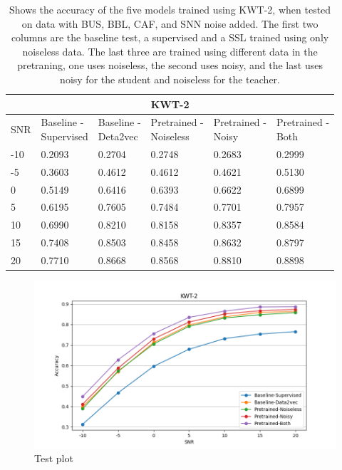 \begin{table}[H]
    \centering
    \begin{tabular}{@{}llllll@{}}
        \multicolumn{6}{c}{\textbf{KWT-2}}\\
        \toprule
        SNR    & \makecell[l]{ Baseline - \\ Supervised } & \makecell[l]{ Baseline - \\ Deta2vec } & \makecell[l]{ Pretrained - \\ Noiseless } & \makecell[l]{ Pretrained - \\ Noisy } & \makecell[l]{ Pretrained - \\ Both } \\ \midrule
        -10  & 0.2093 & 0.2704 & 0.2748 & 0.2683 & 0.2999 \\
        -5   & 0.3603 & 0.4612 & 0.4612 & 0.4621 & 0.5130 \\
        0    & 0.5149 & 0.6416 & 0.6393 & 0.6622 & 0.6899 \\
        5    & 0.6195 & 0.7605 & 0.7484 & 0.7701 & 0.7957 \\
        10   & 0.6990 & 0.8210 & 0.8158 & 0.8357 & 0.8584 \\
        15   & 0.7408 & 0.8503 & 0.8458 & 0.8632 & 0.8797 \\
        20   & 0.7710 & 0.8668 & 0.8568 & 0.8810 & 0.8898 \\
        
        \bottomrule
    \end{tabular}
    \caption{Shows the accuracy of the five models trained using KWT-2, when tested on data with BUS, BBL, CAF, and SNN noise added. The first two columns are the baseline test, a supervised and a SSL trained using only noiseless data. The last three are trained using different data in the pretraning, one uses noiseless, the second uses noisy, and the last uses noisy for the student and noiseless for the teacher.}
    \label{tab:KWT-2_snrmix_busxbblxcafxssn}
\end{table}

\begin{figure}[H]
    \centering
    \includegraphics[width=\textwidth]{incl/img/results/kwt2_busxbblxcafxsnn.png}
    \caption{Test plot}
    \label{fig:KWT-2_snrmix_busxbblxcafxssn}
\end{figure}

